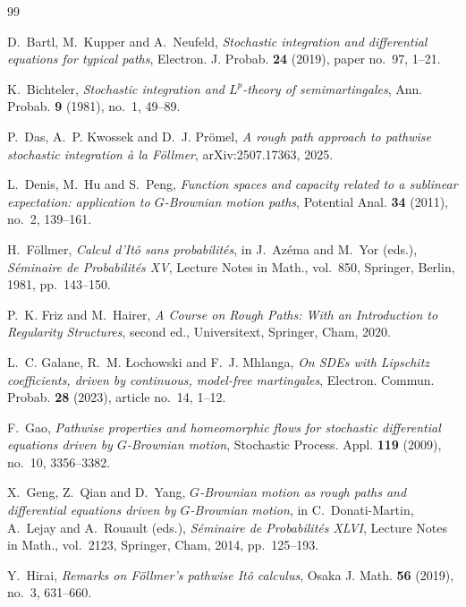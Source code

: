 \documentclass[11pt,reqno]{amsart}
\theoremstyle{plain}
\theoremstyle{definition}
\begin{document}

\begin{thebibliography}{99}

D.~Bartl, M.~Kupper and A.~Neufeld,
\emph{Stochastic integration and differential equations for typical paths},
Electron. J. Probab. \textbf{24} (2019), paper no.~97, 1--21.

K.~Bichteler,
\emph{Stochastic integration and \(L^p\)-theory of semimartingales},
Ann. Probab. \textbf{9} (1981), no.~1, 49--89.

P.~Das, A.~P. Kwossek and D.~J. Pr\"omel,
\emph{A rough path approach to pathwise stochastic integration \`a la
F\"ollmer},
arXiv:2507.17363, 2025.

L.~Denis, M.~Hu and S.~Peng,
\emph{Function spaces and capacity related to a sublinear expectation:
application to \(G\)-Brownian motion paths},
Potential Anal. \textbf{34} (2011), no.~2, 139--161.

H.~F{\"o}llmer,
\emph{Calcul d'It{\^o} sans probabilit{\'e}s},
in J.~Az{\'e}ma and M.~Yor (eds.),
\emph{S{\'e}minaire de Probabilit{\'e}s XV},
Lecture Notes in Math., vol.~850, Springer, Berlin, 1981, pp.~143--150.

P.~K. Friz and M.~Hairer,
\emph{A Course on Rough Paths: With an Introduction to Regularity
Structures}, second ed.,
Universitext, Springer, Cham, 2020.

L.~C. Galane, R.~M. {\L}ochowski and F.~J. Mhlanga,
\emph{On SDEs with Lipschitz coefficients, driven by continuous,
model-free martingales},
Electron. Commun. Probab. \textbf{28} (2023), article no.~14, 1--12.

F.~Gao,
\emph{Pathwise properties and homeomorphic flows for stochastic
differential equations driven by \(G\)-Brownian motion},
Stochastic Process. Appl. \textbf{119} (2009), no.~10, 3356--3382.

X.~Geng, Z.~Qian and D.~Yang,
\emph{\(G\)-Brownian motion as rough paths and differential equations driven
by \(G\)-Brownian motion},
in C.~Donati-Martin, A.~Lejay and A.~Rouault (eds.),
\emph{S\'eminaire de Probabilit\'es XLVI},
Lecture Notes in Math., vol.~2123, Springer, Cham, 2014, pp.~125--193.

Y.~Hirai,
\emph{Remarks on F\"ollmer's pathwise It\^o calculus},
Osaka J. Math. \textbf{56} (2019), no.~3, 631--660.


\end{thebibliography}
\end{document}
